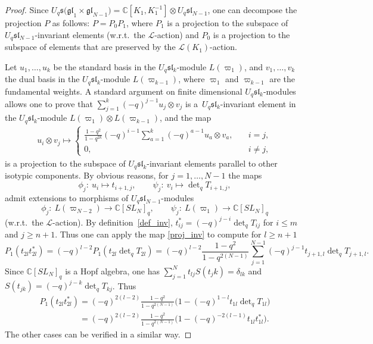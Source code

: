 \documentclass[11pt]{article}
\begin{document}
\begin{proof} Since $U_q \mathfrak{s(gl}_1 \times \mathfrak{gl}_{N-1})=\mathbb C[K_1,K_1^{-1}] \otimes U_q
\mathfrak{sl}_{N-1}$, one can decompose the projection $P$ as follows: $P=P_0P_1$, where $P_1$ is a
projection to the subspace of $U_q \mathfrak{sl}_{N-1}$-invariant elements (w.r.t.\ the $\mathcal{L}$-action)
and $P_0$ is a projection to the subspace of elements that are preserved by the $\mathcal{L}(K_1)$-action.

Let $u_1,\dots,u_k$ be the standard basis in the $U_q \mathfrak{sl}_k$-module $L(\varpi_1)$, and
$v_1,\ldots,v_k$ the dual basis in the $U_q \mathfrak{sl}_k$-module $L(\varpi_{k-1})$, where $\varpi_1$ and
$\varpi_{k-1}$ are the fundamental weights. A standard argument on f\/inite dimensional $U_q
\mathfrak{sl}_k$-modules allows one to prove that $\sum\limits_{j=1}^k (-q)^{j-1}u_j \otimes v_j$ is a~$U_q
\mathfrak{sl}_k$-invariant element in the $U_q \mathfrak{sl}_k$-module $L(\varpi_1) \otimes L(\varpi_{k-1})$,
and the map
\begin{gather}\label{proj_inv}
u_i \otimes v_j \mapsto \begin{cases} \displaystyle \frac{1-q^2}{1-q^{2k}}(-q)^{i-1}\sum_{a=1}^k (-q)^{a-1} u_a \otimes v_a, \quad &  i=j,
\\ 0, \quad & i \neq j,
\end{cases}
\end{gather}
is a projection to the subspace of $U_q \mathfrak{sl}_k$-invariant elements parallel to other isotypic
components. By obvious reasons, for $j=1,\ldots,N-1$ the maps
\[
\phi_j: \ u_i \mapsto t_{i+1,j},\qquad \psi_j: \ v_i \mapsto \det \nolimits_q T_{i+1,j},
 \] admit extensions to morphisms of
$U_q \mathfrak{sl}_{N-1}$-modules
\[
\phi_j: \ L(\varpi_{N-2}) \rightarrow \mathbb C[SL_N]_q, \qquad \psi_j: \ L(\varpi_1) \rightarrow \mathbb
C[SL_N]_q
\]
(w.r.t.\ the $\mathcal{L}$-action). By def\/inition~\eqref{def_inv}, $t_{ij}^*=(-q)^{j-i}\det \nolimits_qT_{ij}$
for $i \leq m$ and $j \geq n+1$. Thus one can apply the map \eqref{proj_inv} to compute for $l \geq n+1$
\[
P_1(t_{2l}t_{2l}^*)=(-q)^{l-2}P_1(t_{2l} \det \nolimits_q T_{2l})
=(-q)^{l-2}\frac{1-q^2}{1-q^{2(N-1)}}\sum_{j=1}^{N-1}(-q)^{j-1}t_{j+1,l}\det \nolimits_q T_{j+1,l}.
\]
Since $\mathbb C[SL_N]_q$ is a Hopf algebra, one has $\sum\limits_{j=1}^{N} t_{lj}S(t_jk)=\delta_{lk}$ and
$S(t_{jk})=(-q)^{j-k}\det \nolimits_q T_{kj}$. Thus
\begin{gather*}
P_1(t_{2l}t_{2l}^*)=(-q)^{2(l-2)}\frac{1-q^2}{1-q^{2(N-1)}}\big( 1-(-q)^{1-l}t_{1l}\det \nolimits_q
T_{1l}\big)
\\
\phantom{P_1(t_{2l}t_{2l}^*)}{} = (-q)^{2(l-2)}\frac{1-q^2}{1-q^{2(N-1)}}\big( 1-(-q)^{-2(l-1)}t_{1l}t_{1l}^*\big).
\end{gather*}
The other cases can be verif\/ied in a similar way. \end{proof}
\end{document}
